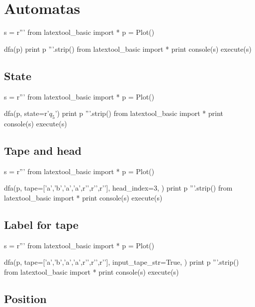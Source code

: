 \section{Automatas}


\begin{python}
s = r'''
from latextool_basic import *
p = Plot()

dfa(p)
print p
'''.strip()
from latextool_basic import *
print console(s)
execute(s)
\end{python}


\newpage
\subsection{State}
\begin{python}
s = r'''
from latextool_basic import *
p = Plot()

dfa(p,
    state=r'$q_5$')
print p
'''.strip()
from latextool_basic import *
print console(s)
execute(s)
\end{python}


\newpage
\subsection{Tape and head}
\begin{python}
s = r'''
from latextool_basic import *
p = Plot()

dfa(p,
    tape=['a','b','a','a',r'\SPACE',r'\SPACE',r'\SPACE'],
    head_index=3,
    )
print p
'''.strip()
from latextool_basic import *
print console(s)
execute(s)
\end{python}




\subsection{Label for tape}

\begin{python}
s = r'''
from latextool_basic import *
p = Plot()

dfa(p,
    tape=['a','b','a','a',r'\SPACE',r'\SPACE',r'\SPACE'],
    input_tape_str=True,
    )
print p
'''.strip()
from latextool_basic import *
print console(s)
execute(s)
\end{python}



\newpage
\subsection{Position}

